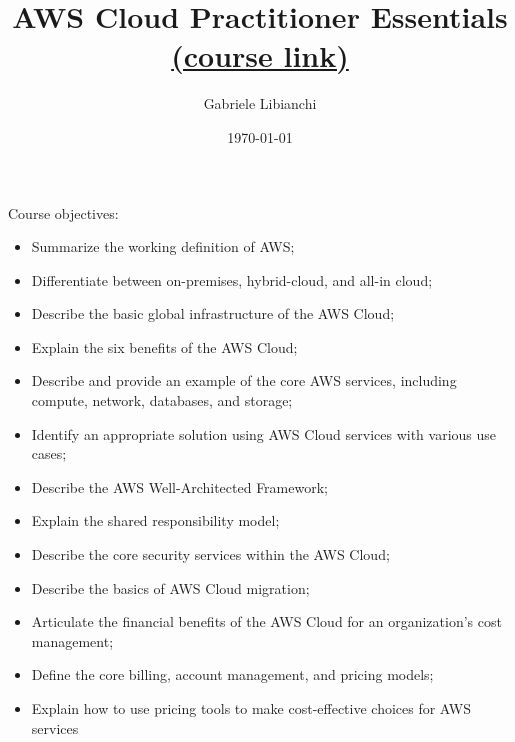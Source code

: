 \documentclass{article}
\title{AWS Cloud Practitioner Essentials \href{https://www.aws.training/Details/eLearning?id=60697}{(course link)} }
\author{Gabriele Libianchi}
\date{\today}
\theoremstyle{definition}
\begin{document}
\maketitle

\vspace{20pt}
Course objectives:
\begin{itemize}
    \item Summarize the working definition of AWS;
    \item Differentiate between on-premises, hybrid-cloud, and all-in cloud;
    \item Describe the basic global infrastructure of the AWS Cloud;
    \item Explain the six benefits of the AWS Cloud;
    \item Describe and provide an example of the core AWS services, including compute, network, databases, and storage;
    \item Identify an appropriate solution using AWS Cloud services with various use cases;
    \item Describe the AWS Well-Architected Framework;
    \item Explain the shared responsibility model;
    \item Describe the core security services within the AWS Cloud;
    \item Describe the basics of AWS Cloud migration;
    \item Articulate the financial benefits of the AWS Cloud for an organization’s cost management;
    \item Define the core billing, account management, and pricing models;
    \item Explain how to use pricing tools to make cost-effective choices for AWS services
\end{itemize}
\end{document}
